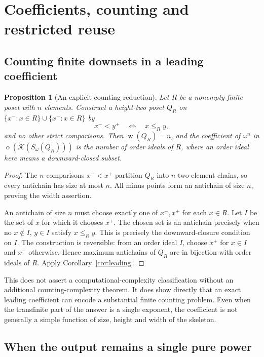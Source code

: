 \documentclass[11pt,a4paper]{article}
\newtheorem{proposition}[theorem]{Proposition}
\theoremstyle{definition}
\theoremstyle{remark}
\newcommand{\K}{\mathcal K}
\newcommand{\ot}{\operatorname{o}}
\newcommand{\wid}{\operatorname{w}}
\begin{document}
\section{Coefficients, counting and restricted reuse}\label{sec:counting}

\subsection{Counting finite downsets in a leading coefficient}

\begin{proposition}[An explicit counting reduction]\label{prop:counting}
Let $R$ be a nonempty finite poset with $n$ elements. Construct a height-two
poset $Q_R$ on $\{x^-:x\in R\}\cup\{x^+:x\in R\}$ by
\[
 x^-<y^+\quad\Longleftrightarrow\quad x\le_R y,
\]
and no other strict comparisons. Then $\wid(Q_R)=n$, and the coefficient
of $\omega^n$ in $\ot(\K(S_\omega(Q_R)))$ is the number of order ideals
of $R$, where an order ideal here means a downward-closed subset.
\end{proposition}

\begin{proof}
The $n$ comparisons $x^-<x^+$ partition $Q_R$ into $n$ two-element chains,
so every antichain has size at most $n$. All minus points form an
antichain of size $n$, proving the width assertion.

An antichain of size $n$ must choose exactly one of $x^-,x^+$ for each
$x\in R$. Let $I$ be the set of $x$ for which it chooses $x^+$. The chosen
set is an antichain precisely when no $x\notin I$, $y\in I$ satisfy
$x\le_R y$. This is precisely the downward-closure condition on $I$.
The construction is reversible: from an order ideal $I$, choose $x^+$ for
$x\in I$ and $x^-$ otherwise. Hence maximum antichains of $Q_R$ are in
bijection with order ideals of $R$. Apply Corollary~\ref{cor:leading}.
\end{proof}

This does not assert a computational-complexity classification without
an additional counting-complexity theorem. It does show directly that an
exact leading coefficient can encode a substantial finite counting
problem. Even when the transfinite part of the answer is a single
exponent, the coefficient is not generally a simple function of size,
height and width of the skeleton.

\subsection{When the output remains a single pure power}
\end{document}
